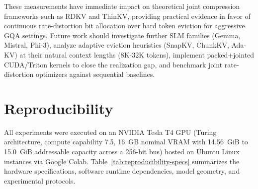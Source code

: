 \documentclass[sigconf,nonacm]{acmart}
\begin{document}
These measurements have immediate impact on theoretical joint compression frameworks such as RDKV and ThinKV, providing practical evidence in favor of continuous rate-distortion bit allocation over hard token eviction for aggressive GQA settings. Future work should investigate further SLM families (Gemma, Mistral, Phi-3), analyze adaptive eviction heuristics (SnapKV, ChunkKV, Ada-KV) at their natural context lengths (8K-32K tokens), implement packed+jointed CUDA/Triton kernels to close the realization gap, and benchmark joint rate-distortion optimizers against sequential baselines.


\section{Reproducibility}
\label{sec:reproducibility}

All experiments were executed on an NVIDIA Tesla T4 GPU (Turing architecture, compute capability 7.5, 16~GB nominal VRAM with 14.56~GiB to 15.0~GiB addressable capacity across a 256-bit bus) hosted on Ubuntu Linux instances via Google Colab. Table~\ref{tab:reproducibility-specs} summarizes the hardware specifications, software runtime dependencies, model geometry, and experimental protocols.
\end{document}

